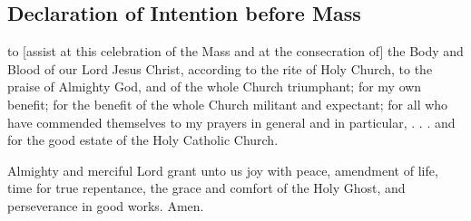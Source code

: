 \vspace{-0.25\baselineskip}

\subsection{Declaration of Intention before Mass}
 to [assist at this celebration of the Mass and at the consecration of] the Body and Blood of our Lord Jesus Christ, according to the rite of Holy Church, to the praise of Almighty God, and of the whole Church triumphant; for my own benefit; for the benefit of the whole Church militant and expectant; for all who have commended themselves to my prayers in general and in particular,  . . . and for the good estate of the Holy Catholic Church.
\par
%
 Almighty and merciful Lord grant unto us joy with peace, amendment of life, time for true repentance, the grace and comfort of the Holy Ghost, and perseverance in good works. Amen.


